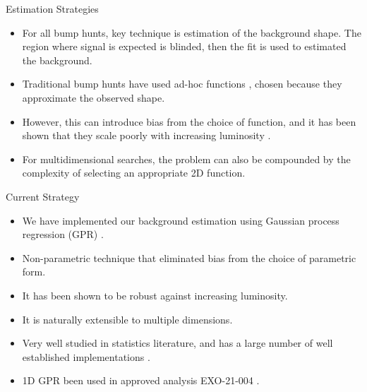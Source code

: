 \documentclass[10pt]{beamer}
\begin{document}
\begin{frame}{Estimation Strategies}
  \begin{splitcol}[0.55]
    \begin{col}
      \begin{itemize}
      \item For all bump hunts, key technique is estimation of the background shape.
        The region where signal is expected is blinded, then the fit is used to estimated the background.
      \item Traditional bump hunts have used ad-hoc functions \cite{zisopoulos_parametric_2023}, chosen because they approximate the observed shape. 
      \item However, this can introduce bias from the choice of function, and it has been shown that they scale poorly with increasing luminosity \cite{frate_modeling_2017}.
      \item For multidimensional searches, the problem can also be compounded by the complexity of selecting an appropriate 2D function.
      \end{itemize}
    \end{col}
    \begin{col}
      \begin{center}
      \end{center}
    \end{col}
  \end{splitcol}
\end{frame}

\begin{frame}{Current Strategy}
  \begin{itemize}
  \item We have implemented our background estimation using Gaussian process regression (GPR) \cite{rasmussen_gaussian_2006}.
  \item Non-parametric technique that eliminated bias from the choice of parametric form.
  \item It has been shown to be robust against increasing luminosity\cite{frate_modeling_2017}.
  \item It is naturally extensible to multiple dimensions.
  \item Very well studied in statistics literature\cite{rasmussen_gaussian_2006}, and has a large number of well established implementations \cite{noauthor_comparison_2024, gardner_gpytorch_2021}.
  \item 1D GPR been used in approved analysis EXO-21-004 \cite{cms_collaboration_searches_2024}.
  \end{itemize}
\end{frame}
\end{document}
